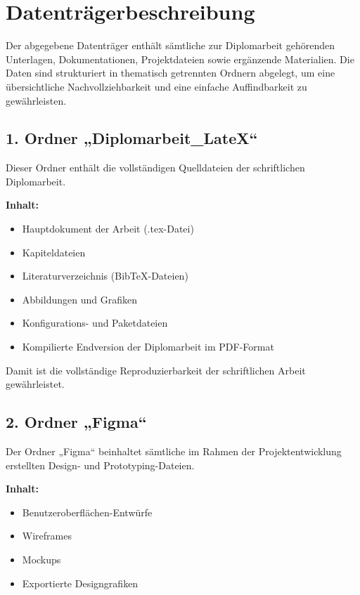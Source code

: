 \section{Datenträgerbeschreibung}
 
Der abgegebene Datenträger enthält sämtliche zur Diplomarbeit gehörenden Unterlagen, Dokumentationen, Projektdateien sowie ergänzende Materialien.  
Die Daten sind strukturiert in thematisch getrennten Ordnern abgelegt, um eine übersichtliche Nachvollziehbarkeit und eine einfache Auffindbarkeit zu gewährleisten.
 
\subsection*{1. Ordner „Diplomarbeit\_LateX“}
 
Dieser Ordner enthält die vollständigen Quelldateien der schriftlichen Diplomarbeit.
 
\textbf{Inhalt:}
\begin{itemize}
    \item Hauptdokument der Arbeit (.tex-Datei)
    \item Kapiteldateien
    \item Literaturverzeichnis (Bib\TeX-Dateien)
    \item Abbildungen und Grafiken
    \item Konfigurations- und Paketdateien
    \item Kompilierte Endversion der Diplomarbeit im PDF-Format
\end{itemize}
 
Damit ist die vollständige Reproduzierbarkeit der schriftlichen Arbeit gewährleistet.
 
\subsection*{2. Ordner „Figma“}
 
Der Ordner „Figma“ beinhaltet sämtliche im Rahmen der Projektentwicklung erstellten Design- und Prototyping-Dateien.
 
\textbf{Inhalt:}
\begin{itemize}
    \item Benutzeroberflächen-Entwürfe
    \item Wireframes
    \item Mockups
    \item Exportierte Designgrafiken
\end{itemize}
 
